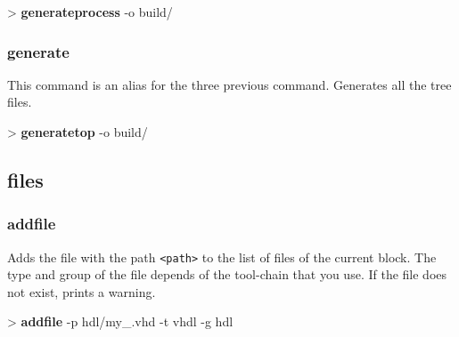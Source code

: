 \documentclass[10pt,a4paper]{article}
\begin{document}

\begin{sampletitle}
> \textbf{\tool{} generateprocess} -o build/
\end{sampletitle}

\subsubsection{generate}

This command is an alias for the three previous command. Generates all the tree files.\\


\begin{sampletitle}
> \textbf{\tool{} generatetop} -o build/
\end{sampletitle}


\subsection{files}
\subsubsection{addfile}
\label{subsec:addfile}

Adds the file with the path \texttt{<path>} to the list of files of the current \kind{} block. The type and group of the file depends of the tool-chain that you use. If the file does not exist, prints a warning.\\


\begin{sampletitle}
> \textbf{\tool{} addfile} -p hdl/my\_\kind{}.vhd -t vhdl -g hdl
\end{sampletitle}
\end{document}

